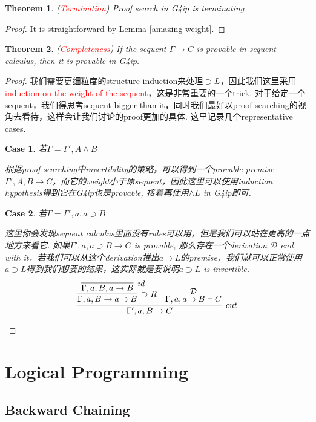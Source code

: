 \documentclass{article}
\theoremstyle{plain}
\newtheorem{theorem}{Theorem}
\newtheorem{case}{Case}
\theoremstyle{nonumberplain}
\newtheorem{proof}{Proof}
\newcommand{\redt}[1]{\textcolor{red}{#1}}
\begin{document}
\begin{theorem}
\rm (\redt{Termination}) Proof search in G4ip is terminating
\end{theorem}

\begin{proof}
It is straightforward by Lemma \ref{amazing-weight}.
\end{proof}

\begin{theorem}
\rm (\redt{Completeness}) If the sequent $\Gamma \to C$ is provable in sequent calculus, then it is provable in G4ip.
\end{theorem}


\begin{proof}
\rm 我们需要更细粒度的structure induction来处理$\supset L$，因此我们这里采用\redt{induction on the weight of the sequent}，这是非常重要的一个trick. 对于给定一个sequent，我们得思考sequent bigger than it，同时我们最好以proof searching的视角去看待，这样会让我们讨论的proof更加的具体. 这里记录几个representative cases. 
\begin{case}
若$\Gamma = \Gamma', A \wedge B$

根据proof searching中invertibility的策略，可以得到一个provable premise $\Gamma', A, B \to C$，而它的weight小于原sequent，因此这里可以使用induction hypothesis得到它在G4ip也是provable, 接着再使用$\wedge L$ in G4ip即可.
\end{case}
\begin{case}
若$\Gamma = \Gamma', a, a\supset B$

这里你会发现sequent calculus里面没有rules可以用，但是我们可以站在更高的一点地方来看它. 如果$\Gamma', a, a \supset B \to C$ is provable, 那么存在一个derivation $\mathcal{D}$ end with it，若我们可以从这个derivation推出$a \supset L$的premise，我们就可以正常使用$a \supset L$得到我们想要的结果，这实际就是要说明$a \supset L$ is invertible. 
$$
\infer[cut]{\Gamma',a, B \to C}{\infer[\supset R]{\Gamma,a,B \to a \supset B}{\infer[id]{\Gamma,a,B,a \to B}{}} & \deduce{\Gamma, a, a\supset B \vdash C}{\mathcal{D}}}
$$
\end{case}
\end{proof}

 
\newpage
\section{Logical Programming}

\subsection{Backward Chaining}
\end{document}
